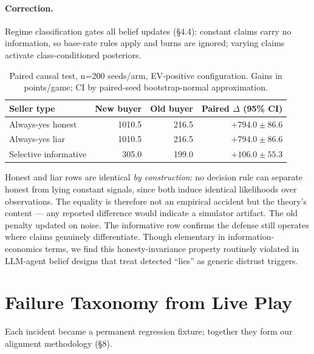\documentclass[11pt]{article}
\begin{document}
\paragraph{Correction.} Regime classification gates all belief updates (\S4.4): constant claims carry no information, so base-rate rules apply and burns are ignored; varying claims activate class-conditioned posteriors.

\begin{table}[t]\centering\small
\caption{Paired causal test, n=200 seeds/arm, EV-positive configuration. Gains in points/game; CI by paired-seed bootstrap-normal approximation.}
\label{tab:f6}
\begin{tabular}{lrrr}
\toprule
Seller type & New buyer & Old buyer & Paired $\Delta$ (95\% CI) \\
\midrule
Always-yes honest & 1010.5 & 216.5 & $\mathbf{+794.0 \pm 86.6}$ \\
Always-yes liar & 1010.5 & 216.5 & $\mathbf{+794.0 \pm 86.6}$ \\
Selective informative & 305.0 & 199.0 & $\mathbf{+106.0 \pm 55.3}$ \\
\bottomrule
\end{tabular}
\end{table}

Honest and liar rows are identical \emph{by construction}: no decision rule
can separate honest from lying constant signals, since both induce identical
likelihoods over observations. The equality is therefore not an empirical
accident but the theory's content --- any reported difference would indicate a
simulator artifact. The old penalty updated on noise. The informative row confirms the defense still operates where claims genuinely differentiate. Though elementary in information-economics terms, we find this honesty-invariance property routinely violated in LLM-agent belief designs that treat detected ``lies'' as generic distrust triggers.

\section{Failure Taxonomy from Live Play}
Each incident became a permanent regression fixture; together they form our alignment methodology (\S8).
\end{document}
